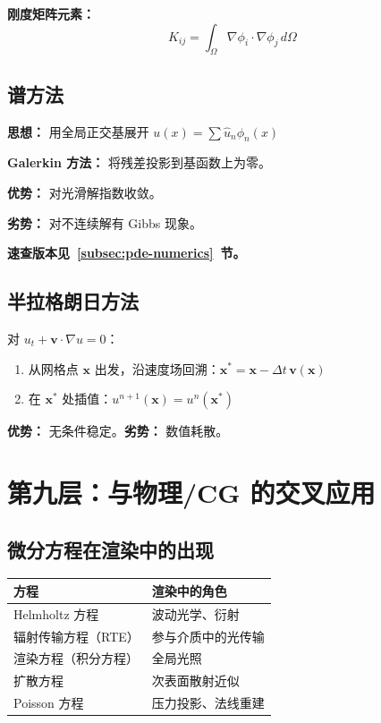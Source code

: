 \textbf{刚度矩阵元素：}
\[
K_{ij} = \int_\Omega \nabla\phi_i \cdot \nabla\phi_j\,d\Omega
\]

\subsection{谱方法}

\textbf{思想：} 用全局正交基展开 $u(x) = \sum \hat{u}_n \phi_n(x)$

\textbf{Galerkin 方法：} 将残差投影到基函数上为零。

\textbf{优势：} 对光滑解指数收敛。

\textbf{劣势：} 对不连续解有 Gibbs 现象。

\textbf{速查版本见~\ref{subsec:pde-numerics}~节。}

\subsection{半拉格朗日方法}

对 $u_t + \mathbf{v}\cdot\nabla u = 0$：
\begin{enumerate}
  \item 从网格点 $\mathbf{x}$ 出发，沿速度场回溯：$\mathbf{x}^* = \mathbf{x} - \Delta t\,\mathbf{v}(\mathbf{x})$
  \item 在 $\mathbf{x}^*$ 处插值：$u^{n+1}(\mathbf{x}) = u^n(\mathbf{x}^*)$
\end{enumerate}

\textbf{优势：} 无条件稳定。\textbf{劣势：} 数值耗散。

\section{第九层：与物理/CG 的交叉应用}

\subsection{微分方程在渲染中的出现}

\begin{center}
\begin{tabular}{p{4cm}p{5cm}}
\toprule
\textbf{方程} & \textbf{渲染中的角色} \\
\midrule
Helmholtz 方程 & 波动光学、衍射 \\
辐射传输方程（RTE） & 参与介质中的光传输 \\
渲染方程（积分方程） & 全局光照 \\
扩散方程 & 次表面散射近似 \\
Poisson 方程 & 压力投影、法线重建 \\
\bottomrule
\end{tabular}
\end{center}

